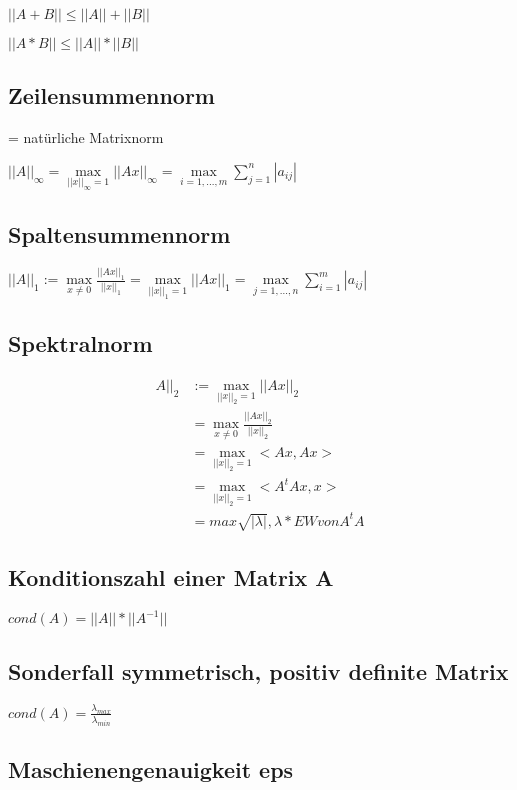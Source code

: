 \documentclass[12pt,a4paper]{article} %
\begin{document}
	$||A+B|| \le ||A|| + ||B||$
	
	$||A*B|| \le ||A|| * ||B||$
	
	\subsection{Zeilensummennorm}
	= natürliche Matrixnorm
	
	$||A||_\infty = \max\limits_{||x||_\infty = 1} ||Ax||_\infty = \max\limits_{i = 1, ..., m} \sum\limits_{j = 1}^{n} |a_{ij}|$
	
	\subsection{Spaltensummennorm}
	
	$||A||_1 := \max\limits_{x \ne 0} \frac{||Ax||_1}{||x||_1} = \max\limits_{||x||_1 = 1} ||Ax||_1 = \max\limits_{j = 1, ..., n} \sum\limits_{i = 1}^{m}|a_{ij}|$
	
	\subsection{Spektralnorm}
	
	\begin{equation*}
	\begin{split}
	A||_2 &:= \max\limits_{||x||_2 = 1} ||Ax||_2 \\
	&= \max\limits_{x \ne 0} \frac{||Ax||_2}{||x||_2} \\
	&= \max\limits_{||x||_2 = 1} <Ax, Ax> \\
	&= \max\limits_{||x||_2 = 1} <A^tAx, x> \\
	&= max{\sqrt{|\lambda |}, \lambda * EW von A^tA}
	\end{split}
	\end{equation*}
	
	\subsection{Konditionszahl einer Matrix A}
	
	$cond(A) = ||A||*||A^{-1}||$
	
	\subsection{Sonderfall symmetrisch, positiv definite Matrix}
	
	$cond(A) = \frac{ \lambda_{max}}{ \lambda_{min}}$
	
	\subsection{Maschienengenauigkeit eps}
	
\end{document}

